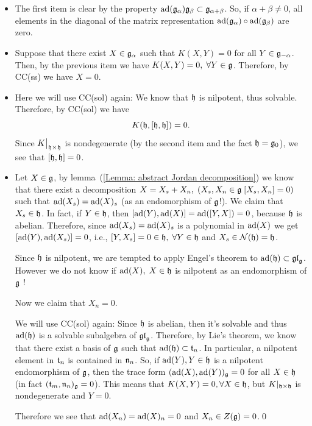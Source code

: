 \begin{itemize}
    \item[1.] The first item is clear by the property $\text{ad}(\mathfrak{g}_\alpha)\mathfrak{g}_\beta\subset \mathfrak{g}_{\alpha+\beta}$. So, if 
$\alpha+\beta\neq0$, all elements in the diagonal of the matrix representation $\text{ad}(\mathfrak{g}_\alpha)\circ\text{ad}(\mathfrak{g}_\beta)$ 
are zero. 
\item[2.] Suppose that there exist $X\in\mathfrak{g}_\alpha$ such that $K(X,Y)=0$ for all $Y\in\mathfrak{g}_{-\alpha}$. Then, by the 
previous item we have $K(X,Y)=0,\;\forall Y\in\mathfrak{g}$. Therefore, by CC(ss) we have $X=0$.
\item[3.] Here we will use CC(sol) again: We know that $\mathfrak{h}$ is nilpotent, thus solvable. Therefore, by CC(sol) we have 
\begin{equation}
    K(\mathfrak{h},[\mathfrak{h},\mathfrak{h}])=0.
\end{equation}
Since $K\big|_{\mathfrak{h}\times\mathfrak{h}}$ is nondegenerate 
(by the second item and the fact $\mathfrak{h}=\mathfrak{g}_0$), we see that $[\mathfrak{h},\mathfrak{h}]=0$.
\item[4.]  Let $X\in\mathfrak{g}$, by lemma~(\ref{Lemma: abstract Jordan decomposition}) we know that there exist 
a decomposition $X=X_s+X_n,\;(X_s,X_n\in\mathfrak{g}\; [X_s,X_n]=0)$ 
such that $\text{ad}(X_s)=\text{ad}(X)_s$ (as an endomorphism of $\mathfrak{g}$!). We claim that $X_s\in\mathfrak{h}$. In fact, if $Y\in\mathfrak{h}$, then 
$[\text{ad}(Y),\text{ad}(X)]=\text{ad}([Y,X])=0$, because $\mathfrak{h}$ is abelian. Therefore, since $\text{ad}(X_s)=\text{ad}(X)_s$ is a polynomial in 
$\text{ad}(X)$ we get $[\text{ad}(Y),\text{ad}(X_s)]=0$, i.e., 
$[Y,X_s]=0\in \mathfrak{h},\;\forall Y\in\mathfrak{h}$ and $X_s\in\mathcal{N}(\mathfrak{h})=\mathfrak{h}$.
\begin{dang}
    Since $\mathfrak{h}$ is nilpotent, we are tempted to apply Engel's theorem to $\text{ad}(\mathfrak{h})\subset\mathfrak{gl}_{\mathfrak{g}}$. However
we do not know if $\text{ad}(X),\;X\in\mathfrak{h}$ is nilpotent as an endomorphism of $\mathfrak{g}$ !
\end{dang}

Now we claim that $X_n=0$.\par

We will use CC(sol) again:
Since $\mathfrak{h}$ is abelian, then it's solvable and thus $\text{ad}(\mathfrak{h})$ is a solvable subalgebra of $\mathfrak{gl}_{\mathfrak{g}}$. 
Therefore, by Lie's theorem, we know that there exist a basis of $\mathfrak{g}$ such that 
$\text{ad}(\mathfrak{h})\subset \mathfrak{t}_n$. In particular, a nilpotent element in $\mathfrak{t}_n$ is contained in $\mathfrak{n}_n$. So, if 
$\text{ad}(Y),Y\in\mathfrak{h}$ is a nilpotent endomorphism of $\mathfrak{g}$, then the trace form $(\text{ad}(X),\text{ad}(Y))_{\mathfrak{g}}=0$ for all
$X\in \mathfrak{h}$ (in fact $(\mathfrak{t}_m,\mathfrak{n}_n)_{\mathfrak{g}}=0$). This means that $K(X,Y)=0,\forall X\in\mathfrak{h}$, but 
$K|_{\mathfrak{h}\times\mathfrak{h}}$ is nondegenerate and $Y=0$.\par

Therefore we see that $\text{ad}(X_n)=\text{ad}(X)_n=0$ and $X_n\in Z(\mathfrak{g})=0$.\qed
\end{itemize}
 
